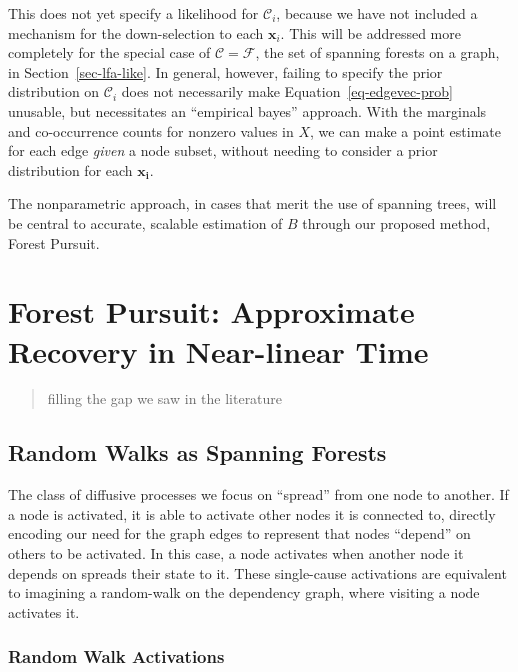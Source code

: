 \documentclass[%
	12pt,
		oneside,
		letterpaper
]{book}
\begin{document}
This does not yet specify a likelihood for \(\mathcal{C}_i\), because we
have not included a mechanism for the down-selection to each
\(\mathbf{x}_i\). This will be addressed more completely for the special
case of \(\mathcal{C}=\mathcal{F}\), the set of spanning forests on a
graph, in Section~\ref{sec-lfa-like}. In general, however, failing to
specify the prior distribution on \(\mathcal{C}_i\) does not necessarily
make Equation~\ref{eq-edgevec-prob} unusable, but necessitates an
``empirical bayes'' approach. With the marginals and co-occurrence
counts for nonzero values in \(X\), we can make a point estimate for
each edge \emph{given} a node subset, without needing to consider a
prior distribution for each \(\mathbf{x_i}\).

The nonparametric approach, in cases that merit the use of spanning
trees, will be central to accurate, scalable estimation of \(B\) through
our proposed method, Forest Pursuit.

\chapter{Forest Pursuit: Approximate Recovery in Near-linear
Time}\label{forest-pursuit-approximate-recovery-in-near-linear-time}

\begin{quote}
filling the gap we saw in the literature
\end{quote}

\section{Random Walks as Spanning
Forests}\label{random-walks-as-spanning-forests}

The class of diffusive processes we focus on ``spread'' from one node to
another. If a node is activated, it is able to activate other nodes it
is connected to, directly encoding our need for the graph edges to
represent that nodes ``depend'' on others to be activated. In this case,
a node activates when another node it depends on spreads their state to
it. These single-cause activations are equivalent to imagining a
random-walk on the dependency graph, where visiting a node activates it.

\subsection{Random Walk Activations}\label{random-walk-activations}
\end{document}
